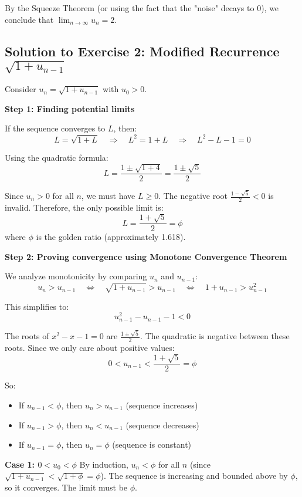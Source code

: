 \documentclass[12pt,a4paper]{article}
\theoremstyle{definition}
\begin{document}
By the Squeeze Theorem (or using the fact that the "noise" decays to 0), we conclude that $\lim_{n \to \infty} u_n = 2$.

\subsection{Solution to Exercise 2: Modified Recurrence $\sqrt{1 + u_{n-1}}$}

Consider $u_n = \sqrt{1 + u_{n-1}}$ with $u_0 > 0$.

\textbf{Step 1: Finding potential limits}

If the sequence converges to $L$, then:
\[
L = \sqrt{1 + L} \quad \Rightarrow \quad L^2 = 1 + L \quad \Rightarrow \quad L^2 - L - 1 = 0
\]

Using the quadratic formula:
\[
L = \frac{1 \pm \sqrt{1 + 4}}{2} = \frac{1 \pm \sqrt{5}}{2}
\]

Since $u_n > 0$ for all $n$, we must have $L \geq 0$. The negative root $\frac{1 - \sqrt{5}}{2} < 0$ is invalid. Therefore, the only possible limit is:
\[
L = \frac{1 + \sqrt{5}}{2} = \phi
\]
where $\phi$ is the golden ratio (approximately 1.618).

\textbf{Step 2: Proving convergence using Monotone Convergence Theorem}

We analyze monotonicity by comparing $u_n$ and $u_{n-1}$:
\[
u_n > u_{n-1} \quad \Leftrightarrow \quad \sqrt{1 + u_{n-1}} > u_{n-1} \quad \Leftrightarrow \quad 1 + u_{n-1} > u_{n-1}^2
\]

This simplifies to:
\[
u_{n-1}^2 - u_{n-1} - 1 < 0
\]

The roots of $x^2 - x - 1 = 0$ are $\frac{1 \pm \sqrt{5}}{2}$. The quadratic is negative between these roots. Since we only care about positive values:
\[
0 < u_{n-1} < \frac{1 + \sqrt{5}}{2} = \phi
\]

So:
\begin{itemize}
    \item If $u_{n-1} < \phi$, then $u_n > u_{n-1}$ (sequence increases)
    \item If $u_{n-1} > \phi$, then $u_n < u_{n-1}$ (sequence decreases)
    \item If $u_{n-1} = \phi$, then $u_n = \phi$ (sequence is constant)
\end{itemize}

\textbf{Case 1: $0 < u_0 < \phi$}
By induction, $u_n < \phi$ for all $n$ (since $\sqrt{1 + u_{n-1}} < \sqrt{1 + \phi} = \phi$). The sequence is increasing and bounded above by $\phi$, so it converges. The limit must be $\phi$.
\end{document}
